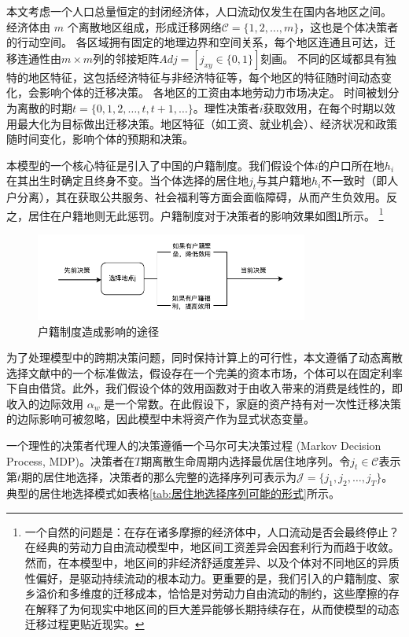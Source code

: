\documentclass[
  a4paper,
  zihao=-4,
  fontset=mac,
  AutoFakeBold,
  AutoFakeSlant,
  oneside]{ctexbook}
\let\oldfootnote\footnote
\renewcommand{\footnote}[1]{%
  \oldfootnote{\setstretch{1.5}#1}%
}
\begin{document}
本文考虑一个人口总量恒定的封闭经济体，人口流动仅发生在国内各地区之间。
经济体由 $m$ 个离散地区组成，形成迁移网络$\mathcal{C} = \{1,2,\dots,m\}$，这也是个体决策者的行动空间。
各区域拥有固定的地理边界和空间关系，每个地区连通且可达，迁移连通性由$m \times m$列的邻接矩阵$Adj=[j_{xy}\in\{0,1\}]$刻画。 
不同的区域都具有独特的地区特征，这包括经济特征与非经济特征等，每个地区的特征随时间动态变化，会影响个体的迁移决策。
各地区的工资由本地劳动力市场决定。
时间被划分为离散的时期$t=\{0,1,2,\ldots,t,t+1,\ldots\}$。理性决策者$i$获取效用，在每个时期以效用最大化为目标做出迁移决策。地区特征（如工资、就业机会）、经济状况和政策随时间变化，影响个体的预期和决策。

本模型的一个核心特征是引入了中国的户籍制度。我们假设个体$i$的户口所在地$h_i$在其出生时确定且终身不变。当个体选择的居住地$j_t$与其户籍地$h_i$不一致时（即人户分离），其在获取公共服务、社会福利等方面会面临障碍，从而产生负效用。反之，居住在户籍地则无此惩罚。户籍制度对于决策者的影响效果如图\ref{fig:户籍制度造成影响的途径}所示。
\footnote{
一个自然的问题是：在存在诸多摩擦的经济体中，人口流动是否会最终停止？在经典的劳动力自由流动模型中，地区间工资差异会因套利行为而趋于收敛。然而，在本模型中，地区间的非经济舒适度差异、以及个体对不同地区的异质性偏好，是驱动持续流动的根本动力。更重要的是，我们引入的户籍制度、家乡溢价和多维度的迁移成本，恰恰是对劳动力自由流动的制约，这些摩擦的存在解释了为何现实中地区间的巨大差异能够长期持续存在，从而使模型的动态迁移过程更贴近现实。
}

\begin{figure}[!ht]
\centering
\caption{户籍制度造成影响的途径}
\label{fig:户籍制度造成影响的途径}
\includegraphics[width=0.8\textwidth]{images/户口影响.drawio.pdf}
\end{figure}

为了处理模型中的跨期决策问题，同时保持计算上的可行性，本文遵循了动态离散选择文献中的一个标准做法，假设存在一个完美的资本市场，个体可以在固定利率下自由借贷。此外，我们假设个体的效用函数对于由收入带来的消费是线性的，即收入的边际效用 $\alpha_w$ 是一个常数。在此假设下，家庭的资产持有对一次性迁移决策的边际影响可被忽略，因此模型中未将资产作为显式状态变量。

一个理性的决策者代理人的决策遵循一个马尔可夫决策过程 (Markov Decision Process, MDP)。决策者在$T$期离散生命周期内选择最优居住地序列。令$j_t \in \mathcal{C}$表示第$t$期的居住地选择，决策者的那么完整的选择序列可表示为$\mathcal{J}=\{j_1, j_2 ,\dots,j_T\}$。典型的居住地选择模式如表格\ref{tab:居住地选择序列可能的形式}所示。
\end{document}
